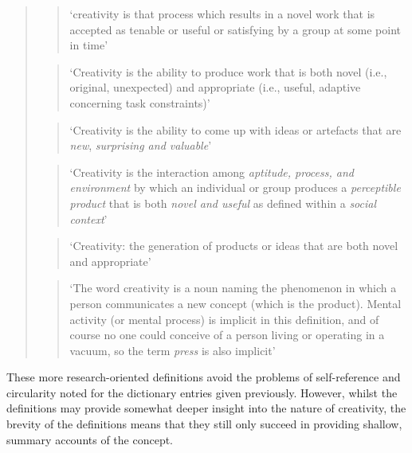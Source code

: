 \documentclass[10pt,letterpaper]{article}
\begin{document}
\begin{quotation}
\begin{quote}
 `creativity is that process which results in a novel work that is accepted as tenable or useful or satisfying by a group at some point in time' %
\cite[p. 218]{stein63}
\end{quote}
\begin{quote}
`Creativity is the ability to produce work that is both novel (i.e., original, unexpected) and appropriate (i.e., useful, adaptive concerning task constraints)'
\cite[p. 3]{sternberg99a}
\end{quote}
\begin{quote}
`Creativity is the ability to come up with ideas or artefacts that are {\em new}, {\em surprising and valuable}'
\cite[p. 1]{boden04}
\end{quote}
\begin{quote}
`Creativity is the interaction among \emph{aptitude, process, and environment} by which an individual or group produces a \emph{perceptible product} that is both \emph{novel and useful} as defined within a \emph{social context}'
\cite[p. 90]{plucker04defn}
\end{quote}
\begin{quote}
`Creativity: the generation of products or ideas that are both novel and appropriate' 
\cite[p. 570]{hennessey10}
\end{quote}
\begin{quote}
`The word creativity is a noun naming the phenomenon in which a person communicates a new concept (which is the product). Mental activity (or mental process) is implicit in this definition, and of course no one could conceive of a person living or operating in a vacuum, so the term \emph{press} is also implicit'
\cite[p. 305]{rhodes61}
\end{quote}
\end{quotation}

These more research-oriented definitions avoid the problems of self-reference and circularity noted for the dictionary entries given previously. However, whilst the definitions may provide somewhat deeper insight into the nature of creativity, the brevity of the definitions means that they still only succeed in providing shallow, summary accounts of the concept. 
\end{document}
